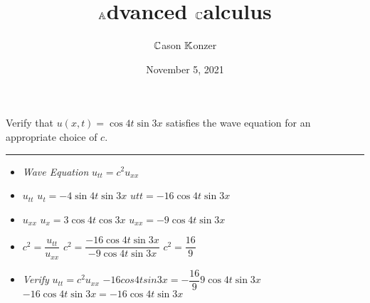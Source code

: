 \documentclass[10pt]{article}
\title{$\mathbb{A}$dvanced $\mathbb{C}$alculus}
\author{$\mathbb{C}$ason $\mathbb{K}$onzer}
\date{November 5, 2021}
\begin{document}
\maketitle

\newpage

\section{\underline{}}
\label{sec: Problem 1}

\noindent
Verify that $ u(x,t) = \cos{4t}\sin{3x} $ satisfies the wave equation for an appropriate choice of $ c $. \\
\vspace{2.5mm}

\hrule 

\vspace{7.5mm}

\begin{itemize}
    \item \textit{Wave Equation} $ u_{tt} = c^2u_{xx} $
    \item $ u_{tt} $
    \subitem $ u_{t} = -4\sin{4t}\sin{3x} $
    \subitem $ u{tt} = -16\cos{4t}\sin{3x} $
    \item $ u_{xx} $
    \subitem $ u_{x} = 3\cos{4t}\cos{3x} $
    \subitem $ u_{xx} = -9\cos{4t}\sin{3x} $
    \item $ \displaystyle c^2 = \dfrac{u_{tt}}{u_{xx}} $
    \subitem $ \displaystyle c^2 = \dfrac{-16\cos{4t}\sin{3x}}{-9\cos{4t}\sin{3x}} $ 
    \subitem $ \displaystyle c^2 = \dfrac{16}{9} $ 
    \item \textit{Verify} $ u_{tt} = c^2u_{xx} $
    \subitem $ \displaystyle -16cos{4t}sin{3x} = -\dfrac{16}{9}9\cos{4t}\sin{3x} $
    \subitem $ -16\cos{4t}\sin{3x} = -16\cos{4t}\sin{3x} $
\end{itemize}

\newpage

\section{\underline{}}
\label{sec: Problem 2}
\end{document}

